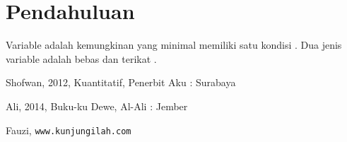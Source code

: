 \documentclass[12pt, times new roman]{article}
\begin{document}
\section{Pendahuluan}
Variable adalah kemungkinan yang minimal memiliki satu kondisi \cite{Shofwan}. Dua jenis variable adalah bebas dan terikat \cite{Ali, Fauzi}.

\begin{thebibliography}{3}
  Shofwan, 2012, Kuantitatif, Penerbit Aku : Surabaya

  Ali, 2014, Buku-ku Dewe, Al-Ali : Jember

  Fauzi, \texttt{www.kunjungilah.com}
\end{thebibliography}
\end{document}
